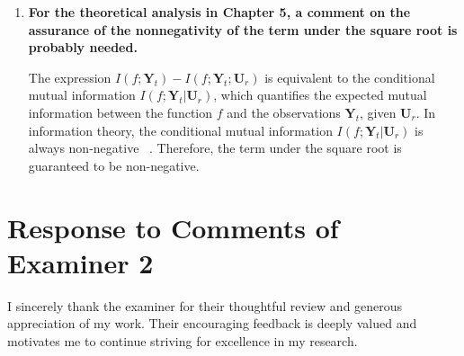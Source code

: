 \documentclass[12pt]{article}
\begin{document}
\begin{enumerate}[leftmargin=0pt, label={\textbf{\arabic*.}}, itemsep=2em]
    Thank you for the observation. In Sections 4.4.3.1 and 4.4.3.2, synthetic functions with known closed-form expressions are used to clearly illustrate the structure of the objective and constraint functions. However, in all experiments, the optimisation algorithms interact with these functions solely through point-wise evaluations (i.e., by querying function values at specific inputs), without utilizing their analytical forms. This setup faithfully mimics a black-box optimisation scenario, as the algorithms have no access to the internal structure of the functions and rely only on input-output queries. Moreover, knowing the closed form of the synthetic function serves as the ground truth, which is essential for objectively evaluating the performance of black-box optimisation methods. It allows for the computation of metrics such as regret or constraint violation, providing a reliable benchmark to assess and compare different algorithms.

    \item \textbf{For the theoretical analysis in Chapter 5, a comment on the assurance of the nonnegativity of the term under the square root is probably needed.}
    
    The expression $I(f; \mathbf{Y}_t) - I(f; \mathbf{Y}_t; \mathbf{U}_r)$ is equivalent to the conditional mutual information $I(f; \mathbf{Y}_t|\mathbf{U}_r)$, which quantifies the expected mutual information between the function $f$ and the observations $\mathbf{Y}_t$, given $\mathbf{U}_r$. In information theory, the conditional mutual information $I(f; \mathbf{Y}_t|\mathbf{U}_r)$ is always non-negative ~\cite[Sec.~2.3]{polyanskiy2014lecture}. Therefore, the term under the square root is guaranteed to be non-negative.

\end{enumerate}
\section*{Response to Comments of Examiner 2}
I sincerely thank the examiner for their thoughtful review and generous appreciation of my work. Their encouraging feedback is deeply valued and motivates me to continue striving for excellence in my research.
\end{document}
